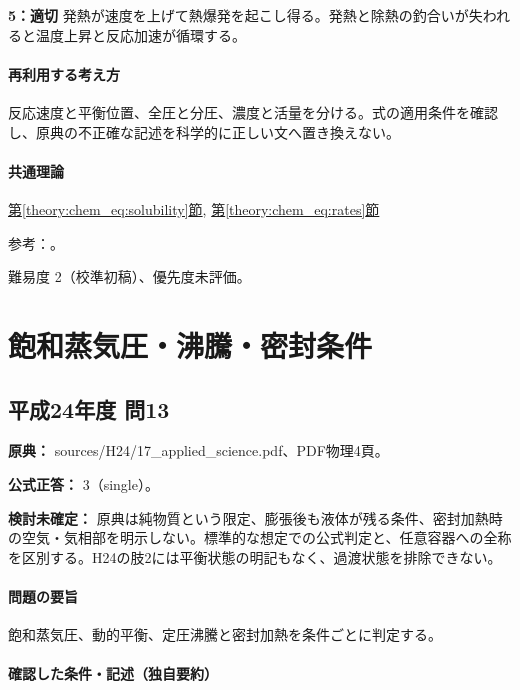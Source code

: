 \noindent\textbf{5：適切} 発熱が速度を上げて熱爆発を起こし得る。発熱と除熱の釣合いが失われると温度上昇と反応加速が循環する。\par

\paragraph{再利用する考え方} 反応速度と平衡位置、全圧と分圧、濃度と活量を分ける。式の適用条件を確認し、原典の不正確な記述を科学的に正しい文へ置き換えない。

\paragraph{共通理論} \hyperref[theory:chem_eq:solubility]{第\ref*{theory:chem_eq:solubility}節}, \hyperref[theory:chem_eq:rates]{第\ref*{theory:chem_eq:rates}節}

\par 参考：\cite{iupac_greenbook2012}。

\par 難易度 2（校準初稿）、優先度未評価。

\section{飽和蒸気圧・沸騰・密封条件}

\subsection{平成24年度 問13}
\label{q:h24-reg-applied-13}

\noindent\textbf{原典：} sources/H24/17\_applied\_science.pdf、PDF物理4頁。

\textbf{公式正答：} 3（single）。

\par\textbf{検討未確定：} 原典は純物質という限定、膨張後も液体が残る条件、密封加熱時の空気・気相部を明示しない。標準的な想定での公式判定と、任意容器への全称を区別する。H24の肢2には平衡状態の明記もなく、過渡状態を排除できない。

\paragraph{問題の要旨} 飽和蒸気圧、動的平衡、定圧沸騰と密封加熱を条件ごとに判定する。

\paragraph{確認した条件・記述（独自要約）}\mbox{}\par

